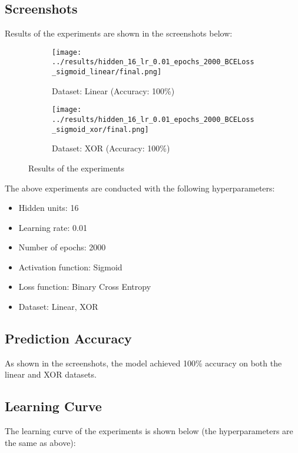 \subsection{Screenshots}

Results of the experiments are shown in the screenshots below:

\begin{figure}[H]
    \centering
    \begin{subfigure}{0.5\textwidth}
        \centering
        \texttt{[image: ../results/hidden\_16\_lr\_0.01\_epochs\_2000\_BCELoss\_sigmoid\_linear/final.png]}
        \caption{Dataset: Linear (Accuracy: 100\%)}
    \end{subfigure}%
    \begin{subfigure}{0.5\textwidth}
        \centering
        \texttt{[image: ../results/hidden\_16\_lr\_0.01\_epochs\_2000\_BCELoss\_sigmoid\_xor/final.png]}
        \caption{Dataset: XOR (Accuracy: 100\%)}
    \end{subfigure}
    \caption{Results of the experiments}
\end{figure}

The above experiments are conducted with the following hyperparameters:

\begin{itemize}
    \item Hidden units: 16
    \item Learning rate: 0.01
    \item Number of epochs: 2000
    \item Activation function: Sigmoid
    \item Loss function: Binary Cross Entropy
    \item Dataset: Linear, XOR
\end{itemize}

\subsection{Prediction Accuracy}

As shown in the screenshots, the model achieved 100\% accuracy on both the linear and XOR datasets.

\subsection{Learning Curve}

The learning curve of the experiments is shown below (the hyperparameters are the same as above):

